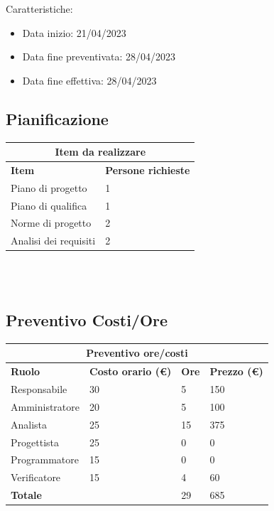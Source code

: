 \documentclass[12pt]{article}
\begin{document}
Caratteristiche:
\begin{itemize}
    \item Data inizio: 21/04/2023
    \item Data fine preventivata: 28/04/2023
    \item Data fine effettiva: 28/04/2023
\end{itemize}
\subsection{Pianificazione}
\begin{center}
    \begin{tabularx}{\textwidth}{|X|X|}
        \hline
        \multicolumn{2}{|c|}{\textbf{Item da realizzare}}\\
        \hline
        \hline
        \textbf{Item} & \textbf{Persone richieste}\\
        \hline
        Piano di progetto & 1\\
        \hline
        Piano di qualifica & 1\\
        \hline
        Norme di progetto & 2\\
        \hline
        Analisi dei requisiti & 2 \\
        \hline
    \end{tabularx}\\[8pt]
    \mbox{}\\
\end{center}
\subsection{Preventivo Costi/Ore}
\begin{center}
    \begin{tabularx}{\textwidth}{|X|X|X|X|}
        \hline
        \multicolumn{4}{|c|}{\textbf{Preventivo ore/costi}}\\
        \hline
        \hline
        \textbf{Ruolo} & \textbf{Costo orario (\euro)} & \textbf{Ore} & \textbf{Prezzo (\euro)}\\
        \hline
        Responsabile    & 30 & 5  & 150\\
        \hline
        Amministratore  & 20 & 5  & 100\\
        \hline
        Analista        & 25 & 15  & 375\\
        \hline
        Progettista     & 25 & 0  & 0\\
        \hline
        Programmatore   & 15 & 0  & 0\\
        \hline
        Verificatore    & 15 & 4  & 60\\
        \hline
        \hline
        \textbf{Totale} &    & 29 & 685\\
        \hline
    \end{tabularx}\\[8pt]
    \mbox{}\\
\end{center}
\end{document}
